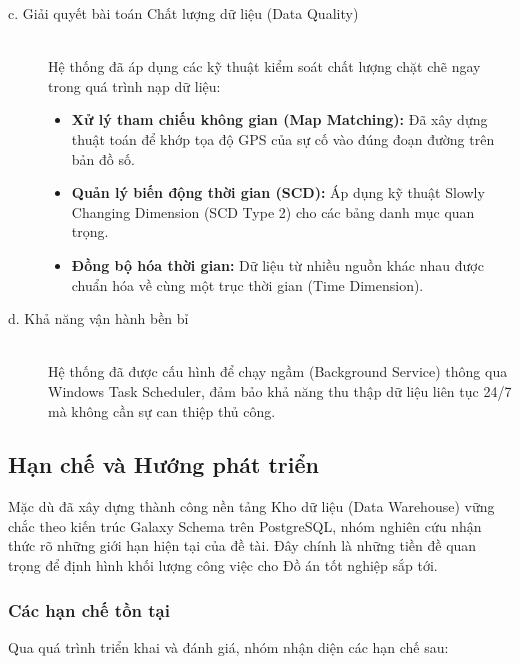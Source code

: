 \begin{description}
    \item[c. Giải quyết bài toán Chất lượng dữ liệu (Data Quality)] \hfill \\
    Hệ thống đã áp dụng các kỹ thuật kiểm soát chất lượng chặt chẽ ngay trong quá trình nạp dữ liệu:
    \begin{itemize}
        \item \textbf{Xử lý tham chiếu không gian (Map Matching):} Đã xây dựng thuật toán để khớp tọa độ GPS của sự cố vào đúng đoạn đường trên bản đồ số.
        \item \textbf{Quản lý biến động thời gian (SCD):} Áp dụng kỹ thuật Slowly Changing Dimension (SCD Type 2) cho các bảng danh mục quan trọng.
        \item \textbf{Đồng bộ hóa thời gian:} Dữ liệu từ nhiều nguồn khác nhau được chuẩn hóa về cùng một trục thời gian (Time Dimension).
    \end{itemize}
    
    \item[d. Khả năng vận hành bền bỉ] \hfill \\
    Hệ thống đã được cấu hình để chạy ngầm (Background Service) thông qua Windows Task Scheduler, đảm bảo khả năng thu thập dữ liệu liên tục 24/7 mà không cần sự can thiệp thủ công.
\end{description}

\subsection{Hạn chế và Hướng phát triển}

Mặc dù đã xây dựng thành công nền tảng Kho dữ liệu (Data Warehouse) vững chắc theo kiến trúc Galaxy Schema trên PostgreSQL, nhóm nghiên cứu nhận thức rõ những giới hạn hiện tại của đề tài. Đây chính là những tiền đề quan trọng để định hình khối lượng công việc cho Đồ án tốt nghiệp sắp tới.

\subsubsection{Các hạn chế tồn tại}
Qua quá trình triển khai và đánh giá, nhóm nhận diện các hạn chế sau:

